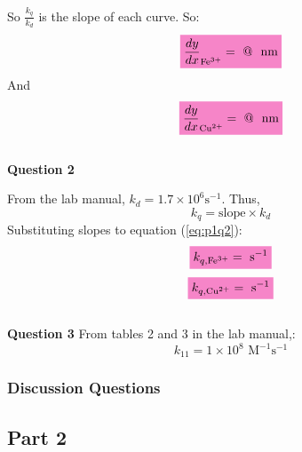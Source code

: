 So $\frac{k_q}{k_d}$ is the slope of each curve. So:
\begin{equation*}
    \mathcolorbox{Lavender}{\frac{dy}{dx}_{\text{Fe}^{3+}} =  \text{ @ }  \text{ nm} }
\end{equation*}
And
\begin{equation*}
    \mathcolorbox{Lavender}{\frac{dy}{dx}_{\text{Cu}^{2+}} =  \text{ @ }  \text{ nm} }
\end{equation*}
\\
\textbf{Question 2}
\par From the lab manual\autocite{lab_manual}, $k_d = 1.7 \times 10^6\text {s}^{-1}$. Thus,
\begin{equation}
    k_q = \text{slope} \times k_d
    \label{eq:p1q2}
\end{equation}
Substituting slopes to equation (\ref{eq:p1q2}):
\begin{equation*}
    \mathcolorbox{Lavender}{k_{q,\text{Fe}^{3+}} =  \text{ s}^{-1}}
\end{equation*}
\begin{equation*}
    \mathcolorbox{Lavender}{k_{q,\text{Cu}^{2+}} =  \text{ s}^{-1}}
\end{equation*}
\\
\textbf{Question 3}
From tables 2 and 3 in the lab manual,:
\begin{equation*}
    k_{11} = 1 \times 10 ^ 8 \text{ M}^{-1}\text{s}^{-1}
\end{equation*}


\subsubsection*{Discussion Questions}

\subsection{Part 2}





